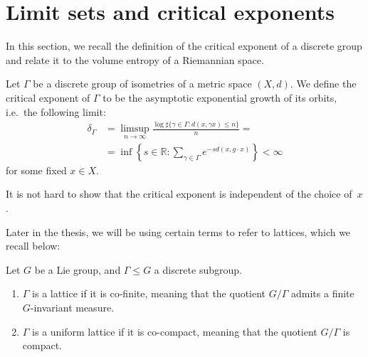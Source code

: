 \documentclass{report}
\begin{document}
\section{Limit sets and critical exponents}
In this section, we recall the definition of the critical exponent of a discrete group and relate it to the volume entropy of a Riemannian space.
\begin{definition}\label{def:group_critical_exponent}
    Let $\Gamma$ be a discrete group of isometries of a metric space $(X,d)$.
    We define the critical exponent of $\Gamma$ to be the asymptotic exponential growth of its orbits, i.e.\ the following limit:
    \begin{align*}
        \delta_\Gamma &= \limsup_{n\to \infty} \frac{\log \sharp \{ \gamma \in \Gamma : d(x, \gamma x) \leq n \}}{n} =\\
        &= \inf \left\{ 
            s \in \mathbb R : \sum_{\gamma \in \Gamma} e^{-s d(x, g \cdot x)}
        \right\}  < \infty
    \end{align*}
    for some fixed $x \in X$.
\end{definition}
\begin{remark}
    It is not hard to show that the critical exponent is independent of the choice of~$x$.    
\end{remark}


Later in the thesis, we will be using certain terms to refer to lattices, which we recall below:
\begin{definition}
    Let $G$ be a Lie group, and $\Gamma \leq G$ a discrete subgroup. 
    \begin{enumerate}[label=(\roman*)]
        \item $\Gamma$ is a lattice if it is co-finite, meaning that the quotient $G/\Gamma$ admits a finite $G$-invariant measure.
        \item $\Gamma$ is a uniform lattice if it is co-compact, meaning that the quotient $G/\Gamma$ is compact.
    \end{enumerate}
\end{definition}
\end{document}
